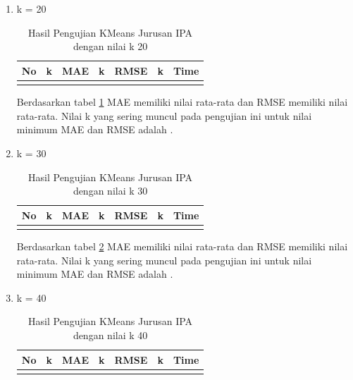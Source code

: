\begin{enumerate}
\begin{enumerate}
            \item k = 20 \\
                \begin{longtable}[H]{|c|c|c|c|c|c|c|}
                    \hline
                    No & k & MAE & k & RMSE & k & Time \\
                    \hline
                    
                    
                     \caption{Hasil Pengujian KMeans Jurusan IPA dengan nilai k 20}
                    \label{tab:ipa k = 20}
                \end{longtable}
                
                Berdasarkan tabel \ref{tab:ipa k = 20} MAE memiliki nilai rata-rata dan RMSE memiliki nilai rata-rata. Nilai k yang sering muncul pada pengujian ini untuk nilai minimum MAE dan RMSE adalah .
                
            \item k = 30 \\
                \begin{longtable}[H]{|c|c|c|c|c|c|c|}
                    \hline
                    No & k & MAE & k & RMSE & k & Time \\
                    \hline
                    
                    
                     \caption{Hasil Pengujian KMeans Jurusan IPA dengan nilai k 30}
                    \label{tab:ipa k = 30}
                \end{longtable}
                
                Berdasarkan tabel \ref{tab:ipa k = 30} MAE memiliki nilai rata-rata dan RMSE memiliki nilai rata-rata. Nilai k yang sering muncul pada pengujian ini untuk nilai minimum MAE dan RMSE adalah .
                
            \item k = 40 \\
                \begin{longtable}[H]{|c|c|c|c|c|c|c|}
                    \hline
                    No & k & MAE & k & RMSE & k & Time \\
                    \hline
                    
                    
                     \caption{Hasil Pengujian KMeans Jurusan IPA dengan nilai k 40}
                    \label{tab:ipa k = 40}
                \end{longtable}
                

\end{enumerate}
\end{enumerate}
